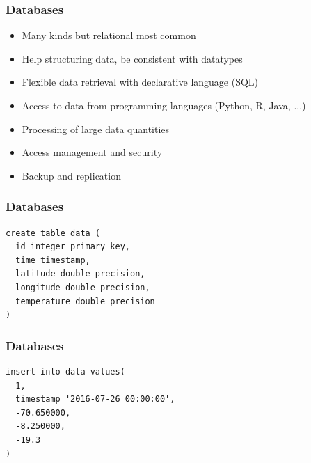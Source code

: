 \documentclass{beamer}
\begin{document}
{
	\begin{frame}[plain]
	  \frametitle{Databases}
	  
	  \begin{itemize}
	  \item Many kinds but relational most common
	  \item Help structuring data, be consistent with datatypes
	  \item Flexible data retrieval with declarative language (SQL)
	  \item Access to data from programming languages (Python, R, Java, ...)
	  \item Processing of large data quantities
	  \item Access management and security
	  \item Backup and replication
	  \end{itemize}
	\end{frame}
}

\begin{frame}[fragile]
  \frametitle{Databases}
  
  \small
  \begin{verbatim}
create table data (
  id integer primary key, 
  time timestamp, 
  latitude double precision, 
  longitude double precision, 
  temperature double precision
)
  \end{verbatim}
\end{frame}

\begin{frame}[fragile]
  \frametitle{Databases}
  
  \small
  \begin{verbatim}
insert into data values(
  1, 
  timestamp '2016-07-26 00:00:00', 
  -70.650000, 
  -8.250000, 
  -19.3
)
  \end{verbatim}
\end{frame}
\end{document}
